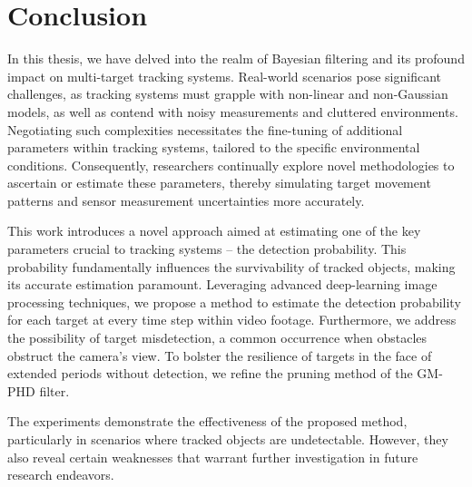 \chapter{Conclusion}
%
%

In this thesis, we have delved into the realm of Bayesian filtering and its profound impact on multi-target tracking systems. Real-world scenarios pose significant challenges, as tracking systems must grapple with non-linear and non-Gaussian models, as well as contend with noisy measurements and cluttered environments. Negotiating such complexities necessitates the fine-tuning of additional parameters within tracking systems, tailored to the specific environmental conditions. Consequently, researchers continually explore novel methodologies to ascertain or estimate these parameters, thereby simulating target movement patterns and sensor measurement uncertainties more accurately.

This work introduces a novel approach aimed at estimating one of the key parameters crucial to tracking systems --
the detection probability. This probability fundamentally influences the survivability of tracked objects, making its accurate estimation paramount. Leveraging advanced deep-learning image processing techniques, we propose a method to estimate the detection probability for each target at every time step within video footage. Furthermore, we address the possibility of target misdetection, a common occurrence when obstacles obstruct the camera's view. To bolster the resilience of targets in the face of extended periods without detection, we refine the pruning method of the GM-PHD filter.

The experiments demonstrate the effectiveness of the proposed method, particularly in scenarios where tracked objects are undetectable. However, they also reveal certain weaknesses that warrant further investigation in future research endeavors.




